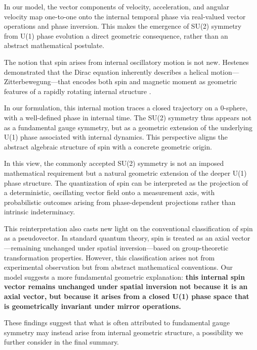 \documentclass[%
 reprint,
 amsmath,amssymb,
 aps,
]{revtex4-1}
\numberwithin{equation}{section}%
\begin{document}
In our model, the vector components of velocity, acceleration, and angular velocity map one-to-one onto the internal temporal phase via real-valued vector operations and phase inversion. This makes the emergence of SU(2) symmetry from U(1) phase evolution a direct geometric consequence, rather than an abstract mathematical postulate.

The notion that spin arises from internal oscillatory motion is not new. Hestenes demonstrated that the Dirac equation inherently describes a helical motion—Zitterbewegung—that encodes both spin and magnetic moment as geometric features of a rapidly rotating internal structure \cite{hestenes2010}.

In our formulation, this internal motion traces a closed trajectory on a 0-sphere, with a well-defined phase in internal time. The SU(2) symmetry thus appears not as a fundamental gauge symmetry, but as a geometric extension of the underlying U(1) phase associated with internal dynamics. This perspective aligns the abstract algebraic structure of spin with a concrete geometric origin.

In this view, the commonly accepted SU(2) symmetry is not an imposed mathematical requirement but a natural geometric extension of the deeper U(1) phase structure. The quantization of spin can be interpreted as the projection of a deterministic, oscillating vector field onto a measurement axis, with probabilistic outcomes arising from phase-dependent projections rather than intrinsic indeterminacy.

This reinterpretation also casts new light on the conventional classification of spin as a pseudovector. In standard quantum theory, spin is treated as an axial vector—remaining unchanged under spatial inversion—based on group-theoretic transformation properties. However, this classification arises not from experimental observation but from abstract mathematical conventions. Our model suggests a more fundamental geometric explanation: \textbf{this internal spin vector remains unchanged under spatial inversion not because it is an axial vector, but because it arises from a closed U(1) phase space that is geometrically invariant under mirror operations.}

These findings suggest that what is often attributed to fundamental gauge symmetry may instead arise from internal geometric structure, a possibility we further consider in the final summary.


\end{document}
